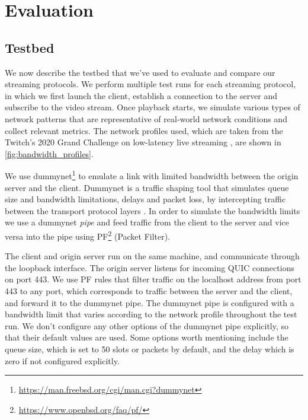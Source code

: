 
\chapter{Evaluation}\label{chapter:evaluation}

\section{Testbed}
We now describe the testbed that we've used to evaluate and compare our streaming protocols. We perform multiple test runs for each streaming protocol, in which we first launch the client, establish a connection to the server and subscribe to the video stream. Once playback starts, we simulate various types of network patterns that are representative of real-world network conditions and collect relevant metrics. The network profiles used, which are taken from the Twitch's 2020 Grand Challenge on low-latency live streaming \parencite{ACMMMSys20}, are shown in \autoref{fig:bandwidth_profiles}.



We use dummynet\footnote{\url{https://man.freebsd.org/cgi/man.cgi?dummynet}} to emulate a link with limited bandwidth between the origin server and the client. Dummynet is a traffic shaping tool that simulates queue size and bandwidth limitations, delays and packet loss, by intercepting traffic between the transport protocol layers \parencite{rizzoDummynetSimpleApproach1997}. %
In order to simulate the bandwidth limits we use a dummynet \textit{pipe} and feed traffic from the client to the server and vice versa into the pipe using PF\footnote{\url{https://www.openbsd.org/faq/pf/}} (Packet Filter).

The client and origin server run on the same machine, and communicate through the loopback interface. The origin server listens for incoming QUIC connections on port 443. We use PF rules that filter traffic on the localhost address from port 443 to any port, which corresponds to traffic between the server and the client, and forward it to the dummynet pipe. The dummynet pipe is configured with a bandwidth limit that varies according to the network profile throughout the test run. We don't configure any other options of the dummynet pipe explicitly, so that their default values are used. Some options worth mentioning include the queue size, which is set to 50 slots or packets by default, and the delay which is zero if not configured explicitly.

